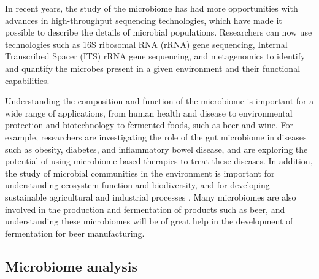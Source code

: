             In recent years, the study of the microbiome has had more opportunities with advances in high-throughput sequencing technologies, which have made it possible to describe the details of microbial populations\cite{bharti2021current}. Researchers can now use technologies such as 16S ribosomal RNA (rRNA) gene sequencing,  Internal Transcribed Spacer (ITS) rRNA gene sequencing, and metagenomics to identify and quantify the microbes present in a given environment and their functional capabilities.
            
            Understanding the composition and function of the microbiome is important for a wide range of applications, from human health and disease to environmental protection and biotechnology to fermented foods, such as beer and wine. For example, researchers are investigating the role of the gut microbiome in diseases such as obesity, diabetes, and inflammatory bowel disease, and are exploring the potential of using microbiome-based therapies to treat these diseases\cite{durack2019gut}. In addition, the study of microbial communities in the environment is important for understanding ecosystem function and biodiversity, and for developing sustainable agricultural and industrial processes \cite{vuong2022little}. Many microbiomes are also involved in the production and fermentation of products such as beer, and understanding these microbiomes will be of great help in the development of fermentation for beer manufacturing.

    
    
    \subsection{Microbiome analysis}

            

